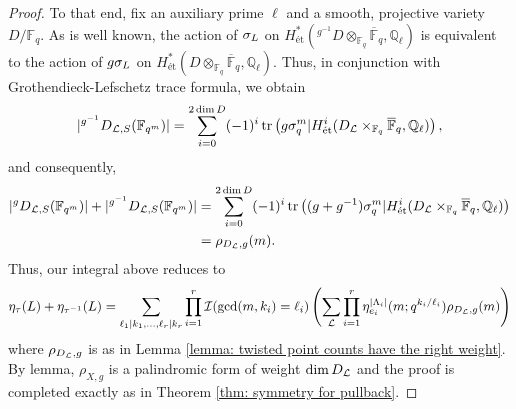 \documentclass[10pt]{article}
\theoremstyle{plain}
\theoremstyle{definition}
\numberwithin{equation}{section}
\begin{document}
\begin{proof}
To that end, fix an auxiliary prime $\ell$ and a smooth, projective variety $D/\mathbb F_q$. As is well known, the action of $\sigma_{L}$ on $H_{\text{\'et}}^*({^{g^{-1}}}D\otimes_{\mathbb F_q}\overline{\mathbb F}_q,\mathbb Q_\ell)$ is equivalent to the action of $g\sigma_{L}$ on $H_{\text{\'et}}^*(D\otimes_{\mathbb F_q}\overline{\mathbb F}_q,\mathbb Q_\ell)$. Thus, in conjunction with Grothendieck-Lefschetz trace formula, we obtain 
\[|{^{g^{-1}}D}_{{\mathcal L},S}(\mathbb F_{q^m})| = \sum_{i=0}^{2\dim D}(-1)^i\operatorname{tr}\left(g\sigma_q^m|H^i_{\text{\'et}}(D_{{\mathcal L}}\times_{\mathbb F_q}\overline{\mathbb F}_q,\mathbb Q_\ell)\right),\]
and consequently,
\begin{align*}
    |{^gD}_{{\mathcal L},S}(\mathbb F_{q^m})|+|{^{g^{-1}}D}_{{\mathcal L},S}(\mathbb F_{q^m})| &= \sum_{i=0}^{2\dim D}(-1)^i\operatorname{tr}\left((g+g^{-1})\sigma_q^m|H^i_{\text{\'et}}(D_{{\mathcal L}}\times_{\mathbb F_q}\overline{\mathbb F}_q,\mathbb Q_\ell)\right)\\
    &= \rho_{D_{\mathcal L},g}(m).
\end{align*} Thus, our integral above reduces to
\[\eta_{\tau}({L}) + \eta_{\tau^{-1}}({L}) = \sum_{\ell_1|k_1,\dots,\ell_r|k_r}\prod_{i=1}^r{\mathcal I}(\gcd(m,k_i) = \ell_i)\left(\sum_{{\mathcal L} }\prod_{i=1}^{r}\eta_{e_i}^{|\Lambda_i|}(m;q^{k_i/\ell_i})\rho_{D_{\mathcal L},g}(m)\right)\]
where $\rho_{D_{\mathcal L},g}$ is as in Lemma \ref{lemma: twisted point counts have the right weight}. By lemma, $\rho_{X,g}$ is a palindromic form of weight $\dim D_{\mathcal L}$ and the proof is completed exactly as in Theorem \ref{thm: symmetry for pullback}.
\end{proof}
\end{document}
